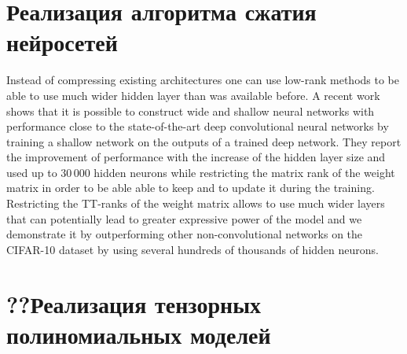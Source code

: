 \section{Реализация алгоритма сжатия нейросетей} \label{sec:exm-code}
Instead of compressing existing architectures one can use low-rank methods to be able to use much wider hidden layer than was available before. A recent work \cite{Jimmy2014lowRankSNN} shows that it is possible to construct wide and shallow neural networks with performance close to the state-of-the-art deep convolutional neural networks by training a shallow network on the outputs of a trained deep network. They report the improvement of performance with the increase of the hidden layer size and used up to $30\,000$ hidden neurons while restricting the matrix rank of the weight matrix in order to be able able to keep and to update it during the training. Restricting the TT-ranks of the weight matrix allows to use much wider layers that can potentially lead to greater expressive power of the model and we demonstrate it by outperforming other non-convolutional networks on the CIFAR-10 dataset by using several hundreds of thousands of hidden neurons.
\section{??Реализация тензорных полиномиальных моделей} \label{sec:nn-code}
